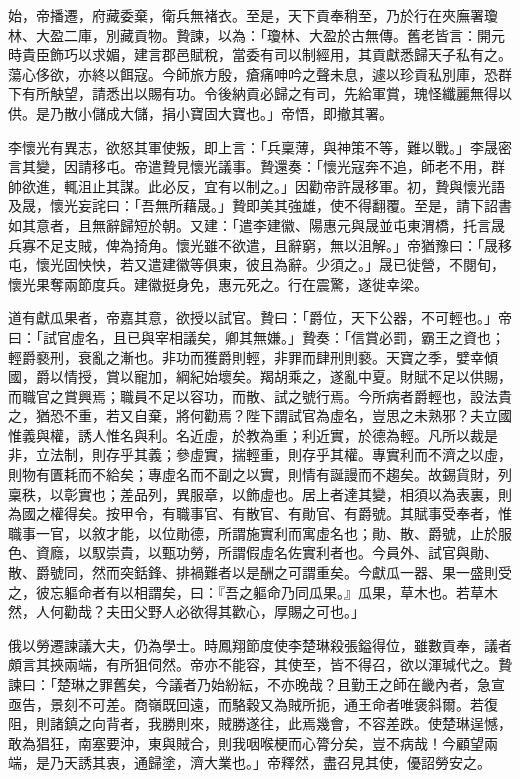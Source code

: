 \begin{pinyinscope}
 始，帝播遷，府藏委棄，衛兵無褚衣。至是，天下貢奉稍至，乃於行在夾廡署瓊林、大盈二庫，別藏貢物。贄諫，以為：「瓊林、大盈於古無傳。舊老皆言：開元時貴臣飾巧以求媚，建言郡邑賦稅，當委有司以制經用，其貢獻悉歸天子私有之。蕩心侈欲，亦終以餌寇。今師旅方殷，瘡痛呻吟之聲未息，遽以珍貢私別庫，恐群下有所觖望，請悉出以賜有功。令後納貢必歸之有司，先給軍賞，瑰怪纖麗無得以供。是乃散小儲成大儲，捐小寶固大寶也。」帝悟，即撤其署。



 李懷光有異志，欲怒其軍使叛，即上言：「兵稟薄，與神策不等，難以戰。」李晟密言其變，因請移屯。帝遣贄見懷光議事。贄還奏：「懷光寇奔不追，師老不用，群帥欲進，輒沮止其謀。此必反，宜有以制之。」因勸帝許晟移軍。初，贄與懷光語及晟，懷光妄詫曰：「吾無所藉晟。」贄即美其強雄，使不得翻覆。至是，請下詔書如其意者，且無辭歸短於朝。又建：「遣李建徽、陽惠元與晟並屯東渭橋，托言晟兵寡不足支賊，俾為掎角。懷光雖不欲遣，且辭窮，無以沮解。」帝猶豫曰：「晟移屯，懷光固怏怏，若又遣建徽等俱東，彼且為辭。少須之。」晟已徙營，不閱旬，懷光果奪兩節度兵。建徽挺身免，惠元死之。行在震驚，遂徙幸梁。



 道有獻瓜果者，帝嘉其意，欲授以試官。贄曰：「爵位，天下公器，不可輕也。」帝曰：「試官虛名，且已與宰相議矣，卿其無嫌。」贄奏：「信賞必罰，霸王之資也；輕爵褻刑，衰亂之漸也。非功而獲爵則輕，非罪而肆刑則褻。天寶之季，嬖幸傾國，爵以情授，賞以寵加，綱紀始壞矣。羯胡乘之，遂亂中夏。財賦不足以供賜，而職官之賞興焉；職員不足以容功，而散、試之號行焉。今所病者爵輕也，設法貴之，猶恐不重，若又自棄，將何勸焉？陛下謂試官為虛名，豈思之未熟邪？夫立國惟義與權，誘人惟名與利。名近虛，於教為重；利近實，於德為輕。凡所以裁是非，立法制，則存乎其義；參虛實，揣輕重，則存乎其權。專實利而不濟之以虛，則物有匱耗而不給矣；專虛名而不副之以實，則情有誕謾而不趨矣。故錫貨財，列稟秩，以彰實也；差品列，異服章，以飾虛也。居上者達其變，相須以為表裏，則為國之權得矣。按甲令，有職事官、有散官、有勛官、有爵號。其賦事受奉者，惟職事一官，以敘才能，以位勛德，所謂施實利而寓虛名也；勛、散、爵號，止於服色、資廕，以馭崇貴，以甄功勞，所謂假虛名佐實利者也。今員外、試官與勛、散、爵號同，然而突銛鋒、排禍難者以是酬之可謂重矣。今獻瓜一器、果一盛則受之，彼忘軀命者有以相謂矣，曰：『吾之軀命乃同瓜果。』瓜果，草木也。若草木然，人何勸哉？夫田父野人必欲得其歡心，厚賜之可也。」



 俄以勞遷諫議大夫，仍為學士。時鳳翔節度使李楚琳殺張鎰得位，雖數貢奉，議者頗言其挾兩端，有所狙伺然。帝亦不能容，其使至，皆不得召，欲以渾瑊代之。贄諫曰：「楚琳之罪舊矣，今議者乃始紛紜，不亦晚哉？且勤王之師在畿內者，急宣亟告，景刻不可差。商嶺既回遠，而駱穀又為賊所扼，通王命者唯褒斜爾。若復阻，則諸鎮之向背者，我勝則來，賊勝遂往，此焉幾會，不容差跌。使楚琳逞憾，敢為猖狂，南塞要沖，東與賊合，則我咽喉梗而心膂分矣，豈不病哉！今顧望兩端，是乃天誘其衷，通歸塗，濟大業也。」帝釋然，盡召見其使，優詔勞安之。




\end{pinyinscope}
